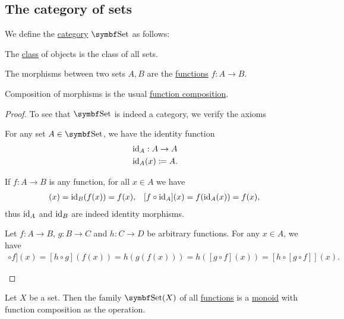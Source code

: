 \subsection{The category of sets}\label{subsec:category_of_sets}

\begin{definition}\label{def:category_of_sets}
  We define the \hyperref[def:category]{category} \( \Cat{Set} \) as follows:
  \begin{description}
     The \hyperref[def:set_zfc]{class} of objects is the class of all sets.

     The morphisms between two sets \( A, B \) are the \hyperref[def:function]{functions} \( f: A \to B \).

     Composition of morphisms is the usual \hyperref[def:function/composition]{function composition}.
  \end{description}
\end{definition}
\begin{proof}
  To see that \( \Cat{Set} \) is indeed a category, we verify the axioms
  \begin{description}
     For any set \( A \in \Cat{Set} \), we have the identity function
    \begin{align*}
      &\operatorname{id}_A: A \to A \\
      &\operatorname{id}_A(x) \coloneqq A.
    \end{align*}

    If \( f: A \to B \) is any function, for all \( x \in A \) we have
    \begin{align*}
      [\Id_B \circ f](x) = \Id_B(f(x)) = f(x),
      &&
      [f \circ \Id_A](x) = f(\Id_A(x)) = f(x),
    \end{align*}
    thus \( \operatorname{id}_A \) and \( \operatorname{id}_B \) are indeed identity morphisms.

     Let \( f: A \to B \), \( g: B \to C \) and \( h: C \to D \) be arbitrary functions. For any \( x \in A \), we have
    \begin{align*}
      [[h \circ g] \circ f](x)
      =
      [h \circ g](f(x))
      =
      h(g(f(x)))
      =
      h([g \circ f](x))
      =
      [h \circ [g \circ f]](x).
    \end{align*}
  \end{description}
\end{proof}

\begin{corollary}\label{thm:functions_over_set_form_monoid}
  Let \( X \) be a set. Then the family \( \Cat{Set}(X) \) of all \hyperref[remark:category_obj_hom]{functions} is a \hyperref[def:magma/monoid]{monoid} with function composition as the operation.
\end{corollary}

